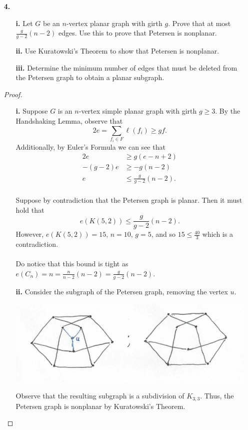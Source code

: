 \documentclass[ 12pt ]{article}
\begin{document}
\begin{enumerate}
		\item[\textbf{4.}]
			\begin{enumerate}
				\item[\textbf{i.}] Let $G$ be an $n$-vertex planar graph with girth $g$. Prove that at most $\frac{g}{g - 2}(n - 2)$ edges. Use this to prove that Petersen is nonplanar.
				\item[\textbf{ii.}] Use Kuratowski's Theorem to show that Petersen is nonplanar.
				\item[\textbf{iii.}] Determine the minimum number of edges that must be deleted from the Petersen graph to obtain a planar subgraph.
			\end{enumerate}

			\begin{proof}
				\begin{enumerate}
					\item[\textbf{i.}] Suppose $G$ is an $n$-vertex simple planar graph with girth $g \geq 3$. By the Handshaking Lemma, observe that $$2e = \sum_{f_i \in F}
						\ell(f_i) \geq gf.$$
						Additionally, by Euler's Formula we can see that
						\begin{align*}
							2e &\geq g(e - n + 2) \\
							-(g - 2)e &\geq -g(n - 2) \\
							e &\leq \frac{g}{g - 2}(n - 2).
						\end{align*} \\
						Suppose by contradiction that the Petersen graph is planar. Then it must hold that $$e(K(5, 2)) \leq \frac{g}{g - 2}(n - 2).$$ However, $e(K(5, 2)) = 15$,
						$n = 10$, $g = 5$, and so $15 \leq \frac{40}{3}$ which is a contradiction. \\ \\

						Do notice that this bound is tight as $e(C_n) = n = \frac{n}{n-2}(n-2) = \frac{g}{g - 2}(n-2)$.

					\item[\textbf{ii.}] Consider the subgraph of the Petersen graph, removing the vertex $u$.
						\begin{center}
							\includegraphics{Capture}
						\end{center}
						Observe that the resulting subgraph is a subdivision of $K_{3, 3}$. Thus, the Petersen graph is nonplanar by Kuratowski's Theorem.


\end{enumerate}
\end{proof}
\end{enumerate}
\end{document}
